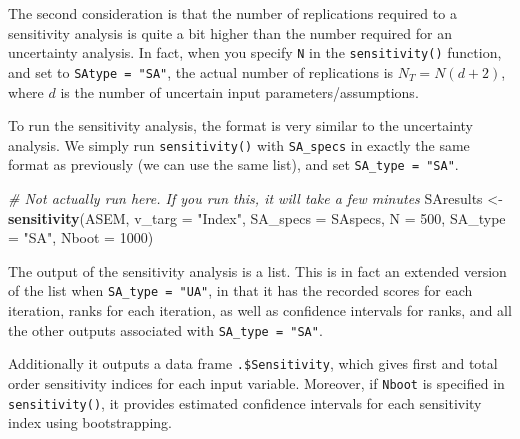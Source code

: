 \documentclass[
]{book}
\newenvironment{Shaded}{\begin{snugshade}}{\end{snugshade}}
\newcommand{\CommentTok}[1]{\textcolor[rgb]{0.56,0.35,0.01}{\textit{#1}}}
\newcommand{\DataTypeTok}[1]{\textcolor[rgb]{0.13,0.29,0.53}{#1}}
\newcommand{\DecValTok}[1]{\textcolor[rgb]{0.00,0.00,0.81}{#1}}
\newcommand{\KeywordTok}[1]{\textcolor[rgb]{0.13,0.29,0.53}{\textbf{#1}}}
\newcommand{\NormalTok}[1]{#1}
\newcommand{\OperatorTok}[1]{\textcolor[rgb]{0.81,0.36,0.00}{\textbf{#1}}}
\newcommand{\StringTok}[1]{\textcolor[rgb]{0.31,0.60,0.02}{#1}}
\begin{document}
The second consideration is that the number of replications required to a sensitivity analysis is quite a bit higher than the number required for an uncertainty analysis. In fact, when you specify \texttt{N} in the \texttt{sensitivity()} function, and set to \texttt{SAtype\ =\ "SA"}, the actual number of replications is \(N_T = N(d +2)\), where \(d\) is the number of uncertain input parameters/assumptions.

To run the sensitivity analysis, the format is very similar to the uncertainty analysis. We simply run \texttt{sensitivity()} with \texttt{SA\_specs} in exactly the same format as previously (we can use the same list), and set \texttt{SA\_type\ =\ "SA"}.

\begin{Shaded}
\begin{Highlighting}[]
\CommentTok{# Not actually run here. If you run this, it will take a few minutes}
\NormalTok{SAresults <-}\StringTok{ }\KeywordTok{sensitivity}\NormalTok{(ASEM, }\DataTypeTok{v_targ =} \StringTok{"Index"}\NormalTok{,}
                         \DataTypeTok{SA_specs =}\NormalTok{ SAspecs,}
                         \DataTypeTok{N =} \DecValTok{500}\NormalTok{,}
                         \DataTypeTok{SA_type =} \StringTok{"SA"}\NormalTok{, }\DataTypeTok{Nboot =} \DecValTok{1000}\NormalTok{)}
\end{Highlighting}
\end{Shaded}

The output of the sensitivity analysis is a list. This is in fact an extended version of the list when \texttt{SA\_type\ =\ "UA"}, in that it has the recorded scores for each iteration, ranks for each iteration, as well as confidence intervals for ranks, and all the other outputs associated with \texttt{SA\_type\ =\ "SA"}.

Additionally it outputs a data frame \texttt{.\$Sensitivity}, which gives first and total order sensitivity indices for each input variable. Moreover, if \texttt{Nboot} is specified in \texttt{sensitivity()}, it provides estimated confidence intervals for each sensitivity index using bootstrapping.

\begin{Shaded}
\end{Shaded}
\end{document}
